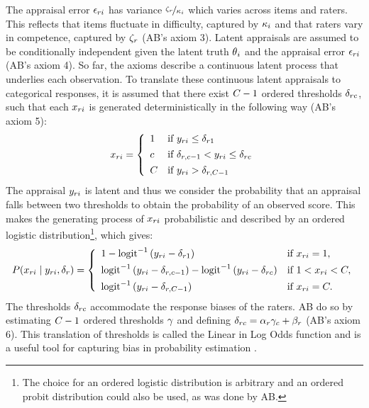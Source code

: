 \documentclass[a4paper]{article}
\newcommand{\AB}{AB}
\begin{document}
The appraisal error $\epsilon_{ri}$ has variance $\nicefrac{\zeta_r}{\kappa_i}$ which varies across items and raters. This reflects that items fluctuate in difficulty, captured by $\kappa_i$ and that raters vary in competence, captured by $\zeta_r$ (\AB{}'s axiom 3). Latent appraisals are assumed to be conditionally independent given the latent truth $\theta{}_i$ and the appraisal error $\epsilon_{ri}$ (\AB{}'s axiom 4). So far, the axioms describe a continuous latent process that underlies each observation. To translate these continuous latent appraisals to categorical responses, it is assumed that there exist $\Tncat - 1$ ordered thresholds $\delta_{rc}$, such that each $x_{ri}$ is generated deterministically in the following way (\AB{}'s axiom 5):
\begin{align*}
	x_{\Irater\Iitem} = 
	\left\{\begin{array}{ll} 
	1		& \text{if }  \Appraisal_{\Irater\Iitem} \leq \Threshold_{\Irater 1} \\[4pt]
	\Incat	& \text{if }  \Threshold_{\Irater, \Incat-1} <  \Appraisal_{\Irater\Iitem} \leq \Threshold_{\Irater\Incat} \\[4pt]
	\Tncat	& \text{if }  \Appraisal_{\Irater\Iitem} > \Threshold_{\Irater, \Tncat-1}
	\end{array} \right.
\end{align*}
The appraisal $y_{ri}$ is latent and thus we consider the probability that an appraisal falls between two thresholds to obtain the probability of an observed score. This makes the generating process of $x_{ri}$ probabilistic and described by an ordered logistic distribution\footnote{The choice for an ordered logistic distribution is arbitrary and an ordered probit distribution could also be used, as was done by \AB{}.}, which gives:
\begin{align*}
P(x_{\Irater\Iitem}\mid  \Appraisal_{\Irater\Iitem},\delta_{\Irater}) = 
\left\{\begin{array}{ll} 
1 - \ilogit{\Appraisal_{\Irater\Iitem} - \Threshold_{\Irater 1}}         & \text{if } x_{\Irater\Iitem} = 1, \\[4pt]
	\ilogit{\Appraisal_{\Irater\Iitem} - \Threshold_{\Irater,\Incat-1}} - 
	\ilogit{\Appraisal_{\Irater\Iitem} - \Threshold_{\Irater\Incat}}         & \text{if } 1 < x_{\Irater\Iitem} < \Tncat,\\[4pt]
	\ilogit{\Appraisal_{\Irater\Iitem} - \Threshold_{\Irater,\Tncat-1}}       & \text{if } x_{\Irater\Iitem} = \Tncat. 
\end{array} \right.
\end{align*}
The thresholds $\delta_{rc}$ accommodate the response biases of the raters. \AB{} do so by estimating $\Tncat-1$ ordered thresholds $\gamma$ and defining $\delta_{rc} = \alpha_r \gamma_c + \beta_r$ (\AB{}'s axiom 6). This translation of thresholds is called the Linear in Log Odds function and is a useful tool for capturing bias in probability estimation \cite{Fox1995, Gonzalez1999, Anders2015cultural}.
\end{document}
